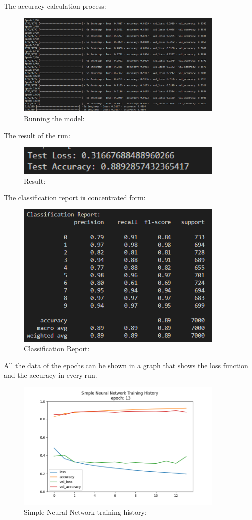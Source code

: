 \documentclass{article}
\begin{document}
The accuracy calculation process:

\begin{figure}[H]
    \caption{Running the model:}
    \centering
    \includegraphics[width=10cm]{imgFolder/RunningSimpleNeuralNetwork.png}
\end{figure}

The result of the run:
\begin{figure}[H]
    \caption{Result:}
    \centering
    \includegraphics[width=10cm]{imgFolder/simpleNeuralNetworkResult.png}
\end{figure}

The classification report in concentrated form:
\begin{figure}[H]
    \caption{Classification Report:}
    \centering
    \includegraphics[width=10cm]{imgFolder/classificationReportSimpleNeuralNetwork.png}
\end{figure}

All the data of the epochs can be shown in a graph that shows the loss function and the accuracy in every run.
\begin{figure}[H]
    \caption{Simple Neural Network training history:}
    \centering
    \includegraphics[width=10cm]{imgFolder/SimpleNeuralNetwork_fig.png}
\end{figure}
\end{document}
